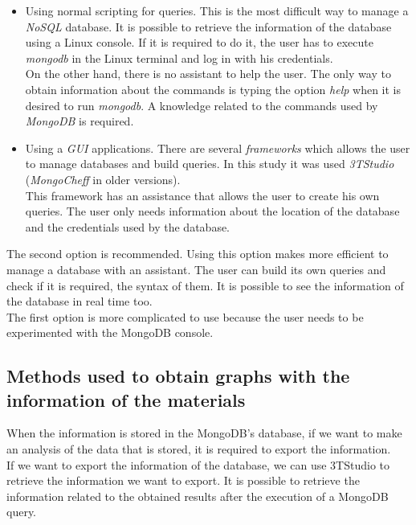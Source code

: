 \begin{itemize}

\item Using normal scripting for queries. This is the most difficult way to manage a \textit{NoSQL} database. It is possible to retrieve the information of the database using a Linux console. If it is required to do it, the user has to execute \textit{mongodb} in the Linux terminal and log in with his credentials.\\

On the other hand, there is no assistant to help the user. The only way to obtain information about the commands is typing the option \textit{help} when it is desired to run \textit{mongodb}. A knowledge related to the commands used by \textit{MongoDB} is required.

\item Using a \textit{GUI} applications. There are several \textit{frameworks} which allows the user to manage databases and build queries. In this study it was used \textit{3TStudio} (\textit{MongoCheff} in older versions).\\

This framework has an assistance that allows the user to create his own queries. The user only needs information about the location of the database and the credentials used by the database.

\end{itemize}

The second option is recommended. Using this option makes more efficient to manage a database with an assistant. The user can build its own queries and check if it is required, the syntax of them. It is possible to see the information of the database in real time too.\\

The first option is more complicated to use because the user needs to be experimented with the MongoDB console.

\subsection{Methods used to obtain graphs with the information of the materials}

When the information is stored in the MongoDB's database, if we want to make an analysis of the data that is stored, it is required to export the information.\\

If we want to export the information of the database, we can use 3TStudio to retrieve the information we want to export. It is possible to retrieve the information related to the obtained results after the execution of a MongoDB query.\\


